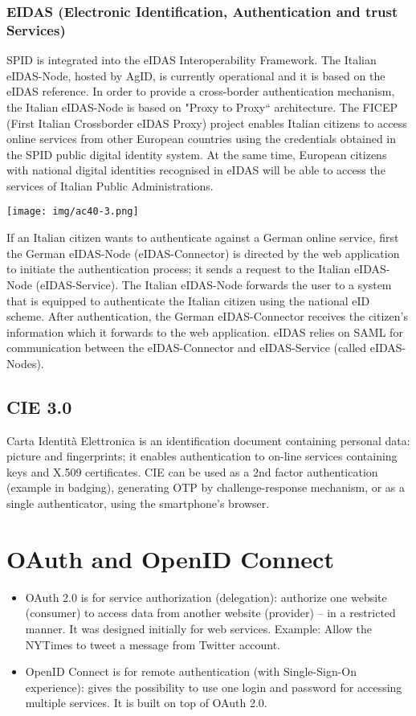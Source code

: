 \documentclass[a4paper, 10pt, titlepage]{article}
\begin{document}
\subsubsection{EIDAS (Electronic Identification, Authentication and trust Services)}
SPID is integrated into the eIDAS Interoperability Framework. The Italian eIDAS-Node, hosted by AgID, is currently operational and it is based on the eIDAS reference. In order to provide a cross-border authentication mechanism, the Italian eIDAS-Node is based on "Proxy to Proxy“ architecture. The FICEP (First Italian Crossborder eIDAS Proxy) project enables Italian citizens to access online services from other European countries using the credentials obtained in the SPID public digital identity system. At the same time, European citizens with national digital identities recognised in eIDAS will be able to access the services of Italian Public Administrations.
\begin{center}
\texttt{[image: img/ac40-3.png]}
\end{center}
If an Italian citizen wants to authenticate against a German online service, first the German eIDAS-Node (eIDAS-Connector) is directed by the web application to initiate the authentication process; it sends a request to the Italian eIDAS-Node (eIDAS-Service). The Italian eIDAS-Node forwards the user to a system that is equipped to authenticate the Italian citizen using the national eID scheme. After authentication, the German eIDAS-Connector receives the citizen’s information which it forwards to the web application. 
eIDAS relies on SAML for communication between the eIDAS-Connector and eIDAS-Service (called eIDAS-Nodes).

\subsection{CIE 3.0}
Carta Identità Elettronica is an identification document containing personal data: picture and fingerprints; it enables authentication to on-line services containing keys and X.509 certificates. 
CIE can be used as a 2nd factor authentication (example in badging), generating OTP by challenge-response mechanism, or as a single authenticator, using the smartphone's browser.


\newpage
\section{OAuth and OpenID Connect}
\begin{itemize}
\item OAuth 2.0 is for service authorization (delegation): authorize one website (consumer) to access data from another website (provider) – in a restricted manner. It was designed initially for web services. Example: Allow the NYTimes to tweet a message from Twitter account.
\item OpenID Connect is for remote authentication (with Single-Sign-On experience): gives the possibility to use one login and password for accessing multiple services. It is built on top of OAuth 2.0.
\end{itemize}
\end{document}
